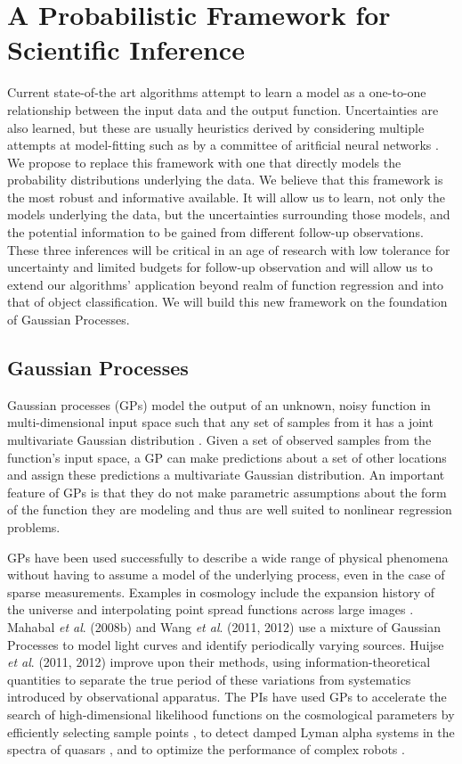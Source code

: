 \documentclass[prd,nofootbib,floatfix,11pt,tightenlines]{revtex4}
\begin{document}
\section{A Probabilistic Framework for Scientific Inference}

Current state-of-the art algorithms attempt to learn a 
model as a one-to-one
relationship between the input data and the output function. Uncertainties are
also learned, but these are usually heuristics derived by considering multiple
attempts at model-fitting such as by a committee of aritficial neural networks
\cite{annz}.  We propose to replace this framework with one that directly models
the probability distributions underlying the data.
We believe that this framework
is the most robust and informative available.  It will allow us
to learn, not only
the models underlying the data, but the uncertainties surrounding those models,
and the potential information to be gained from different follow-up
observations.  These three inferences will be critical in an age of
research with low tolerance for uncertainty and limited budgets for
follow-up observation and will allow us to extend our algorithms' application
beyond realm of function regression and into that of object classification.
We will build this new framework on the foundation of Gaussian Processes.  

\subsection{Gaussian Processes}
\label{sec:gp}


Gaussian processes (GPs) model the output of an unknown, noisy function
in multi-dimensional input space
such that any set of samples from it has a joint multivariate Gaussian
distribution \cite{gp}.  Given a set of observed samples from the function's
input space, a GP
can make predictions about a set of other locations and assign these
predictions a multivariate Gaussian distribution.  An important
feature of GPs is that they do not make parametric assumptions about the
form of the function they are modeling and thus are well suited to
nonlinear regression problems.

GPs have been used successfully to describe a wide range of physical
phenomena without having to assume a model of the underlying process, even
in the case of sparse measurements.  Examples in cosmology include the
expansion history of the universe \cite{ericgp} and interpolating point
spread functions across large images \cite{psf}.  Mahabal {\it et al}. (2008b) 
and Wang {\it et al}. (2011,
2012) use a mixture of Gaussian Processes to model light curves and
identify periodically varying sources.  Huijse {\it et al}. (2011, 2012)
improve upon their methods, using information-theoretical quantities to
separate the true period of these variations from systematics introduced by
observational apparatus.  The PIs have used GPs to accelerate the search of
high-dimensional likelihood functions on the cosmological parameters by
efficiently selecting sample points \cite{daniel2012}, to detect damped Lyman
alpha systems in the spectra of quasars \cite{Garnett12a}, and to optimize the
performance of complex robots \cite{Tesch11a,Tesch11b,Tesch13}.
\end{document}
